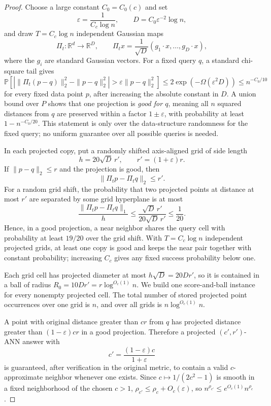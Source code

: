 \documentclass[10pt]{article}
\theoremstyle{definition}
\newcommand{\R}{\mathbb{R}}
\newcommand{\Prb}{\mathbb{P}}
\begin{document}
\begin{proof}
   Choose a large constant $C_0=C_0(c)$ and set
   \[
      \varepsilon=\frac{1}{C_c\log n},
      \qquad
      D=C_0\varepsilon^{-2}\log n,
   \]
   and draw $T=C_c\log n$ independent Gaussian maps
   \[
      \Pi_t:\R^d\to\R^D,
      \qquad
      \Pi_t x=\frac1{\sqrt D}(g_1\cdot x,\ldots,g_D\cdot x),
   \]
   where the $g_i$ are standard Gaussian vectors. For a fixed query $q$, a standard chi-square tail gives
   \[
      \Prb\!\left[
         \left|\|\Pi_t(p-q)\|_2^2-\|p-q\|_2^2\right|
         >\varepsilon\|p-q\|_2^2
      \right]
      \le
      2\exp(-\Omega(\varepsilon^2D))
      \le
      n^{-C_0/10}
   \]
   for every fixed data point $p$, after increasing the absolute constant in $D$. A union bound over $P$ shows that one projection is \emph{good for $q$}, meaning all $n$ squared distances from $q$ are preserved within a factor $1\pm\varepsilon$, with probability at least $1-n^{-C_0/20}$. This statement is only over the data-structure randomness for the fixed query; no uniform guarantee over all possible queries is needed.

   In each projected copy, put a randomly shifted axis-aligned grid of side length
   \[
      h=20\sqrt D\,r',
      \qquad
      r'=(1+\varepsilon)r.
   \]
   If $\|p-q\|_2\le r$ and the projection is good, then
   \[
      \|\Pi_t p-\Pi_t q\|_2\le r'.
   \]
   For a random grid shift, the probability that two projected points at distance at most $r'$ are separated by some grid hyperplane is at most
   \[
      \frac{\|\Pi_t p-\Pi_t q\|_1}{h}
      \le
      \frac{\sqrt D\,r'}{20\sqrt D\,r'}
      \le
      \frac1{20}.
   \]
   Hence, in a good projection, a near neighbor shares the query cell with probability at least $19/20$ over the grid shift. With $T=C_c\log n$ independent projected grids, at least one copy is good and keeps the near pair together with constant probability; increasing $C_c$ gives any fixed success probability below one.

   Each grid cell has projected diameter at most $h\sqrt D=20Dr'$, so it is contained in a ball of radius $R_0=10Dr'=r\log^{O_c(1)}n$. We build one score-and-ball instance for every nonempty projected cell. The total number of stored projected point occurrences over one grid is $n$, and over all grids is $n\log^{O_c(1)}n$.

   A point with original distance greater than $cr$ from $q$ has projected distance greater than $(1-\varepsilon)cr$ in a good projection. Therefore a projected $(c',r')$-ANN answer with
   \[
      c'=\frac{(1-\varepsilon)c}{1+\varepsilon}
   \]
   is guaranteed, after verification in the original metric, to contain a valid $c$-approximate neighbor whenever one exists. Since $c\mapsto 1/(2c^2-1)$ is smooth in a fixed neighborhood of the chosen $c>1$, $\rho_{c'}\le\rho_c+O_c(\varepsilon)$, so $n^{\rho_{c'}}\le e^{O_c(1)}n^{\rho_c}$.


\end{proof}
\end{document}
